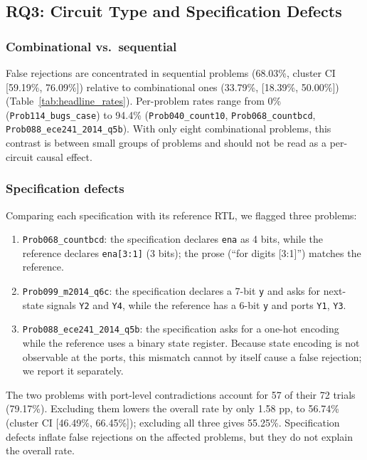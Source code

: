 \documentclass[conference]{IEEEtran}
\begin{document}
\subsection{RQ3: Circuit Type and Specification Defects}
\subsubsection{Combinational vs.\ sequential}
False rejections are concentrated in sequential problems (68.03\%, cluster CI [59.19\%, 76.09\%]) relative to combinational ones (33.79\%, [18.39\%, 50.00\%]) (Table~\ref{tab:headline_rates}). Per-problem rates range from 0\% (\texttt{Prob114\_bugs\_case}) to 94.4\% (\texttt{Prob040\_count10}, \texttt{Prob068\_countbcd}, \texttt{Prob088\_ece241\_2014\_q5b}). With only eight combinational problems, this contrast is between small groups of problems and should not be read as a per-circuit causal effect.

\subsubsection{Specification defects}\label{sec:specdefects}
Comparing each specification with its reference RTL, we flagged three problems:
\begin{enumerate}
    \item \texttt{Prob068\_countbcd}: the specification declares \texttt{ena} as 4 bits, while the reference declares \texttt{ena[3:1]} (3 bits); the prose (``for digits [3:1]'') matches the reference.
    \item \texttt{Prob099\_m2014\_q6c}: the specification declares a 7-bit \texttt{y} and asks for next-state signals \texttt{Y2} and \texttt{Y4}, while the reference has a 6-bit \texttt{y} and ports \texttt{Y1}, \texttt{Y3}.
    \item \texttt{Prob088\_ece241\_2014\_q5b}: the specification asks for a one-hot encoding while the reference uses a binary state register. Because state encoding is not observable at the ports, this mismatch cannot by itself cause a false rejection; we report it separately.
\end{enumerate}
The two problems with port-level contradictions account for 57 of their 72 trials (79.17\%). Excluding them lowers the overall rate by only 1.58 pp, to 56.74\% (cluster CI [46.49\%, 66.45\%]); excluding all three gives 55.25\%. Specification defects inflate false rejections on the affected problems, but they do not explain the overall rate.
\end{document}
